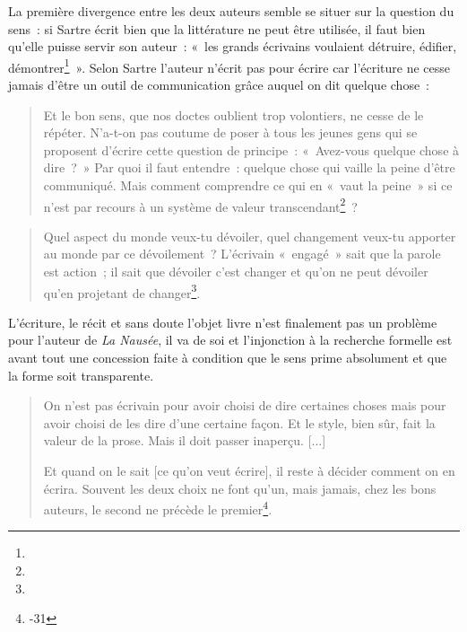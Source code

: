 \documentclass[12pt, a4paper]{article}
\begin{document}


La première divergence entre les deux auteurs semble se situer sur la question du sens~: si Sartre écrit bien que la littérature ne peut être utilisée, il faut bien qu'elle puisse servir son auteur~: «~les grands écrivains voulaient détruire, édifier, démontrer\footnote{}~». Selon Sartre l'auteur n'écrit pas pour écrire car l'écriture ne cesse jamais d'être un outil de communication grâce auquel on dit quelque chose~:
 \begin{quote}
        Et le bon sens, que nos doctes oublient trop volontiers, ne cesse de le répéter. N'a-t-on pas coutume de poser à tous les jeunes gens qui se proposent d'écrire cette question de principe~: «~Avez-vous quelque chose à dire~?~» Par quoi il faut entendre~: quelque chose qui vaille la peine d'être communiqué. Mais comment comprendre ce qui en «~vaut la peine~» si ce n'est par recours à un système de valeur transcendant\footnote{}~? 
    \end{quote}
    \begin{quote}
        Quel aspect du monde veux-tu dévoiler, quel changement veux-tu apporter au monde par ce dévoilement~? L'écrivain «~engagé~» sait que la parole est action~; il sait que dévoiler c'est changer et qu'on ne peut dévoiler qu'en projetant de changer\footnote{}.
    \end{quote}
    
L'écriture, le récit et sans doute l'objet livre n'est finalement pas un problème pour l'auteur de \textit{La Nausée}, il va de soi et l'injonction à la recherche formelle est avant tout une concession faite à condition que le sens prime absolument et que la forme soit transparente.
\begin{quote}
    On n'est pas écrivain pour avoir choisi de dire certaines choses mais pour avoir choisi de les dire d'une certaine façon. Et le style, bien sûr, fait la valeur de la prose. Mais il doit passer inaperçu. [...]

    Et quand on le sait [ce qu'on veut écrire], il reste à décider comment on en écrira. Souvent les deux choix ne font qu'un, mais jamais, chez les bons auteurs, le second ne précède le premier\footnote{-31}.
\end{quote}
\end{document}
